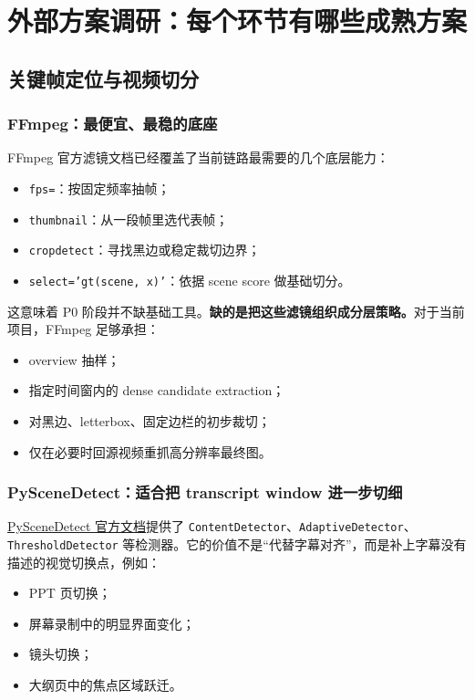 \documentclass[a4paper]{article}
\begin{document}
\section{外部方案调研：每个环节有哪些成熟方案}

\subsection{关键帧定位与视频切分}

\subsubsection{FFmpeg：最便宜、最稳的底座}

FFmpeg 官方滤镜文档已经覆盖了当前链路最需要的几个底层能力：

\begin{itemize}
\item \texttt{fps=}：按固定频率抽帧；
\item \texttt{thumbnail}：从一段帧里选代表帧；
\item \texttt{cropdetect}：寻找黑边或稳定裁切边界；
\item \texttt{select='gt(scene, x)'}：依据 scene score 做基础切分。
\end{itemize}

这意味着 P0 阶段并不缺基础工具。\textbf{缺的是把这些滤镜组织成分层策略。}对于当前项目，FFmpeg 足够承担：

\begin{itemize}
\item overview 抽样；
\item 指定时间窗内的 dense candidate extraction；
\item 对黑边、letterbox、固定边栏的初步裁切；
\item 仅在必要时回源视频重抓高分辨率最终图。
\end{itemize}

\subsubsection{PySceneDetect：适合把 transcript window 进一步切细}

\href{https://www.scenedetect.com/docs/latest/api/detectors.html}{PySceneDetect 官方文档}提供了 \texttt{ContentDetector}、\texttt{AdaptiveDetector}、\texttt{ThresholdDetector} 等检测器。它的价值不是“代替字幕对齐”，而是补上字幕没有描述的视觉切换点，例如：

\begin{itemize}
\item PPT 页切换；
\item 屏幕录制中的明显界面变化；
\item 镜头切换；
\item 大纲页中的焦点区域跃迁。
\end{itemize}
\end{document}
